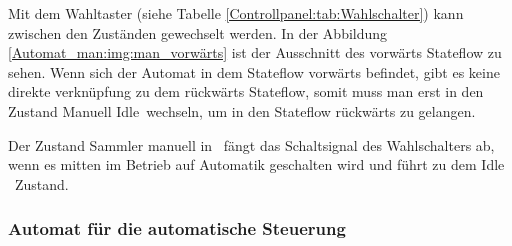 Mit dem Wahltaster (siehe Tabelle \ref{Controllpanel:tab:Wahlschalter}) kann zwischen den Zuständen gewechselt werden. In der Abbildung \ref{Automat_man:img:man_vorwärts} ist der Ausschnitt des vorwärts Stateflow zu sehen. Wenn sich der Automat in dem Stateflow vorwärts befindet, gibt es keine direkte verknüpfung zu dem rückwärts Stateflow, somit muss man erst in den Zustand \frqq Manuell Idle\flqq\ wechseln, um in den Stateflow rückwärts zu gelangen.

Der Zustand \frqq Sammler manuell in \flqq\ fängt  das Schaltsignal des Wahlschalters ab, wenn es mitten im Betrieb auf Automatik geschalten wird und führt zu dem \frqq Idle \flqq\ Zustand.









\subsubsection{Automat für die automatische Steuerung}
\label{Automatensteuerung:Automat_auto}

